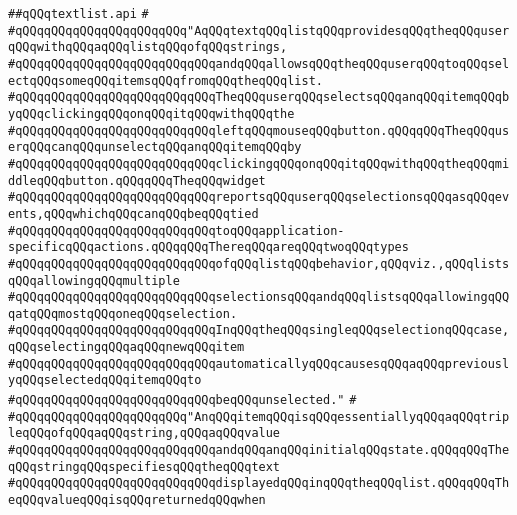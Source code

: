 \label{src/lib/x-kit/widget/old/leaf/textlist.api}
\verb|##qQQqtextlist.api|\newline
\verb|#|\newline
\verb|#qQQqqQQqqQQqqQQqqQQqqQQq"AqQQqtextqQQqlistqQQqprovidesqQQqtheqQQquserqQQqwithqQQqaqQQqlistqQQqofqQQqstrings,|\newline
\verb|#qQQqqQQqqQQqqQQqqQQqqQQqqQQqandqQQqallowsqQQqtheqQQquserqQQqtoqQQqselectqQQqsomeqQQqitemsqQQqfromqQQqtheqQQqlist.|\newline
\verb|#qQQqqQQqqQQqqQQqqQQqqQQqqQQqTheqQQquserqQQqselectsqQQqanqQQqitemqQQqbyqQQqclickingqQQqonqQQqitqQQqwithqQQqthe|\newline
\verb|#qQQqqQQqqQQqqQQqqQQqqQQqqQQqleftqQQqmouseqQQqbutton.qQQqqQQqTheqQQquserqQQqcanqQQqunselectqQQqanqQQqitemqQQqby|\newline
\verb|#qQQqqQQqqQQqqQQqqQQqqQQqqQQqclickingqQQqonqQQqitqQQqwithqQQqtheqQQqmiddleqQQqbutton.qQQqqQQqTheqQQqwidget|\newline
\verb|#qQQqqQQqqQQqqQQqqQQqqQQqqQQqreportsqQQquserqQQqselectionsqQQqasqQQqevents,qQQqwhichqQQqcanqQQqbeqQQqtied|\newline
\verb|#qQQqqQQqqQQqqQQqqQQqqQQqqQQqtoqQQqapplication-specificqQQqactions.qQQqqQQqThereqQQqareqQQqtwoqQQqtypes|\newline
\verb|#qQQqqQQqqQQqqQQqqQQqqQQqqQQqofqQQqlistqQQqbehavior,qQQqviz.,qQQqlistsqQQqallowingqQQqmultiple|\newline
\verb|#qQQqqQQqqQQqqQQqqQQqqQQqqQQqselectionsqQQqandqQQqlistsqQQqallowingqQQqatqQQqmostqQQqoneqQQqselection.|\newline
\verb|#qQQqqQQqqQQqqQQqqQQqqQQqqQQqInqQQqtheqQQqsingleqQQqselectionqQQqcase,qQQqselectingqQQqaqQQqnewqQQqitem|\newline
\verb|#qQQqqQQqqQQqqQQqqQQqqQQqqQQqautomaticallyqQQqcausesqQQqaqQQqpreviouslyqQQqselectedqQQqitemqQQqto|\newline
\verb|#qQQqqQQqqQQqqQQqqQQqqQQqqQQqbeqQQqunselected."|\newline
\verb|#|\newline
\verb|#qQQqqQQqqQQqqQQqqQQqqQQq"AnqQQqitemqQQqisqQQqessentiallyqQQqaqQQqtripleqQQqofqQQqaqQQqstring,qQQqaqQQqvalue|\newline
\verb|#qQQqqQQqqQQqqQQqqQQqqQQqqQQqandqQQqanqQQqinitialqQQqstate.qQQqqQQqTheqQQqstringqQQqspecifiesqQQqtheqQQqtext|\newline
\verb|#qQQqqQQqqQQqqQQqqQQqqQQqqQQqdisplayedqQQqinqQQqtheqQQqlist.qQQqqQQqTheqQQqvalueqQQqisqQQqreturnedqQQqwhen|\newline
